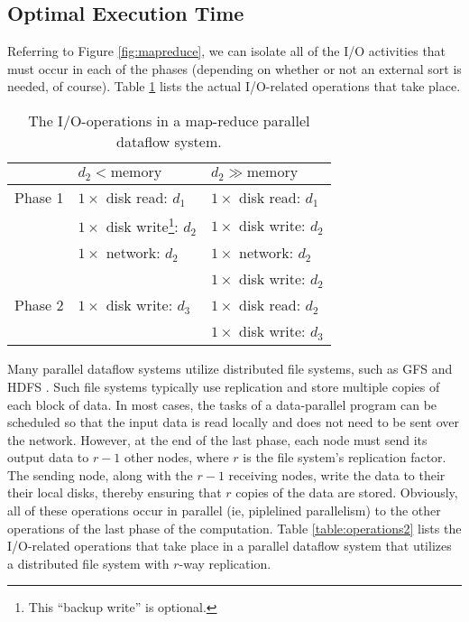 \documentclass{acm_proc_article-sp}
\begin{document}
\subsection{Optimal Execution Time}

Referring to Figure \ref{fig:mapreduce}, we can isolate all of the I/O activities that must occur in each of the phases (depending on whether or not an external sort is needed, of course). Table \ref{table:operations1} lists the actual I/O-related operations that take place.

\begin{table}
\centering
\begin{minipage}{0.5\textwidth}
\centering
\renewcommand{\arraystretch}{1.2}
\begin{tabular}{|l|l|l|}
\hline
        & $d_2 < \text{memory}$          & $d_2 \gg \text{memory}$ \\ \hline
Phase 1 & $1 \times$ disk read:  $d_1$   & $1 \times$ disk read:  $d_1$ \\ 
        & $1 \times$ disk write\footnote{This ``backup write'' is optional.}: $d_2$ & $1 \times$ disk write: $d_2$ \\
        & $1 \times$ network: $d_2$      & $1 \times$ network:    $d_2$ \\
        &                                & $1 \times$ disk write: $d_2$ \\ \hline
Phase 2 & $1 \times$ disk write: $d_3$   & $1 \times$ disk read:  $d_2$ \\
        &                                & $1 \times$ disk write: $d_3$ \\ \hline
\end{tabular}
\caption{The I/O-operations in a map-reduce parallel dataflow system.}
\end{minipage}
\label{table:operations1}
\end{table}

Many parallel dataflow systems utilize distributed file systems, such as GFS \cite{gfs} and HDFS \cite{hdfs}. Such file systems typically use replication and store multiple copies of each block of data. In most cases, the tasks of a data-parallel program can be scheduled so that the input data is read locally and does not need to be sent over the network. However, at the end of the last phase, each node must send its output data to $r - 1$ other nodes, where $r$ is the file system's replication factor. The sending node, along with the $r - 1$ receiving nodes, write the data to their their local disks, thereby ensuring that $r$ copies of the data are stored. Obviously, all of these operations occur in parallel (ie, piplelined parallelism) to the other operations of the last phase of the computation. Table \ref{table:operations2} lists the I/O-related operations that take place in a parallel dataflow system that utilizes a distributed file system with $r$-way replication.
\end{document}
